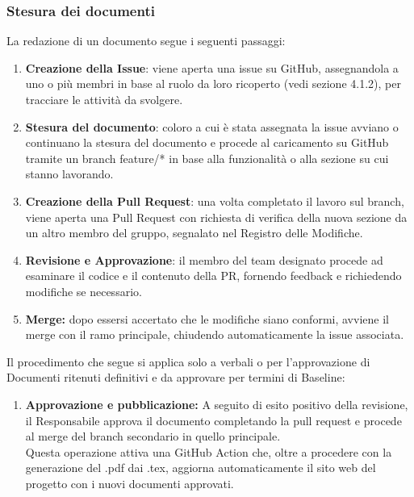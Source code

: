 \subsubsection{Stesura dei documenti}
\label{sec:stesura-documenti}
La redazione di un documento segue i seguenti passaggi: 
\begin{enumerate}\setlength{\itemsep}{0pt}
    \item \textbf{Creazione della Issue}: viene aperta una issue su GitHub, assegnandola a uno o più membri in base al ruolo da loro ricoperto (vedi sezione 4.1.2), per tracciare le attività da svolgere.
    \item \textbf{Stesura del documento}: coloro a cui è stata assegnata la issue avviano o continuano la stesura del documento e procede al caricamento su GitHub tramite un branch feature/* in base alla funzionalità o alla sezione su cui stanno lavorando.
    \item \textbf{Creazione della Pull Request}: una volta completato il lavoro sul branch, viene aperta una Pull Request con richiesta di verifica della nuova sezione da un altro membro del gruppo, segnalato nel Registro delle Modifiche.
    \item \textbf{Revisione e Approvazione}: il membro del team designato procede ad esaminare il codice e il contenuto della PR, fornendo feedback e richiedendo modifiche se necessario.
    \item \textbf{Merge:} dopo essersi accertato che le modifiche siano conformi, avviene il merge con il ramo principale, chiudendo automaticamente la issue associata.
\end{enumerate}
Il procedimento che segue si applica solo a verbali o per l’approvazione di Documenti ritenuti definitivi e da approvare per termini di Baseline:
\begin{enumerate} [resume]
    \item \textbf{Approvazione e pubblicazione:} A seguito di esito positivo della revisione, il Responsabile approva il documento completando la pull request e procede al merge del branch secondario in quello principale.\\ Questa operazione attiva una GitHub Action che, oltre a procedere con la generazione del .pdf dai .tex, aggiorna automaticamente il sito web del progetto con i nuovi documenti approvati.
\end{enumerate}

